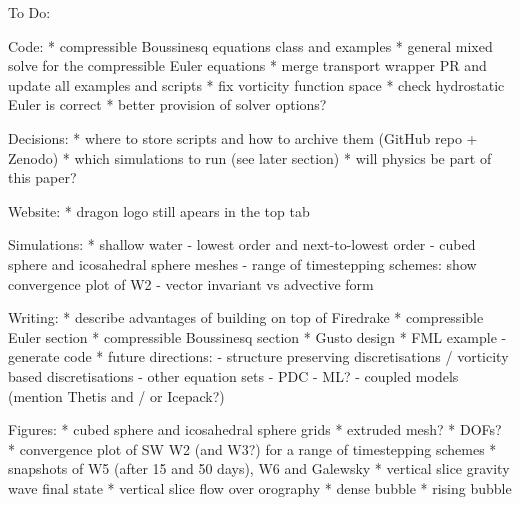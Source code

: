 To Do:

Code:
* compressible Boussinesq equations class and examples
* general mixed solve for the compressible Euler equations
* merge transport wrapper PR and update all examples and scripts
* fix vorticity function space
* check hydrostatic Euler is correct
* better provision of solver options?

Decisions:
* where to store scripts and how to archive them (GitHub repo + Zenodo)
* which simulations to run (see later section)
* will physics be part of this paper?

Website:
* dragon logo still apears in the top tab

Simulations:
* shallow water
 - lowest order and next-to-lowest order
 - cubed sphere and icosahedral sphere meshes
 - range of timestepping schemes: show convergence plot of W2
 - vector invariant vs advective form


Writing:
* describe advantages of building on top of Firedrake
* compressible Euler section
* compressible Boussinesq section
* Gusto design
* FML example
 - generate code
* future directions:
 - structure preserving discretisations / vorticity based discretisations
 - other equation sets
 - PDC
 - ML?
 - coupled models (mention Thetis and / or Icepack?)

Figures:
* cubed sphere and icosahedral sphere grids
* extruded mesh?
* DOFs?
* convergence plot of SW W2 (and W3?) for a range of timestepping schemes
* snapshots of W5 (after 15 and 50 days), W6 and Galewsky
* vertical slice gravity wave final state
* vertical slice flow over orography
* dense bubble
* rising bubble
